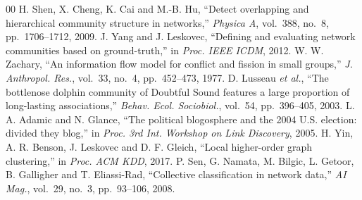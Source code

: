 \documentclass[conference]{IEEEtran}
\begin{document}
\begin{thebibliography}{00}
 H. Shen, X. Cheng, K. Cai and M.-B. Hu, ``Detect overlapping and hierarchical community structure in networks,'' \emph{Physica A}, vol.~388, no.~8, pp.~1706--1712, 2009.
 J. Yang and J. Leskovec, ``Defining and evaluating network communities based on ground-truth,'' in \emph{Proc. IEEE ICDM}, 2012.
 W. W. Zachary, ``An information flow model for conflict and fission in small groups,'' \emph{J. Anthropol. Res.}, vol.~33, no.~4, pp.~452--473, 1977.
 D. Lusseau \emph{et al.}, ``The bottlenose dolphin community of Doubtful Sound features a large proportion of long-lasting associations,'' \emph{Behav. Ecol. Sociobiol.}, vol.~54, pp.~396--405, 2003.
 L. A. Adamic and N. Glance, ``The political blogosphere and the 2004 U.S. election: divided they blog,'' in \emph{Proc. 3rd Int. Workshop on Link Discovery}, 2005.
 H. Yin, A. R. Benson, J. Leskovec and D. F. Gleich, ``Local higher-order graph clustering,'' in \emph{Proc. ACM KDD}, 2017.
 P. Sen, G. Namata, M. Bilgic, L. Getoor, B. Galligher and T. Eliassi-Rad, ``Collective classification in network data,'' \emph{AI Mag.}, vol.~29, no.~3, pp.~93--106, 2008.
\end{thebibliography}
\end{document}
